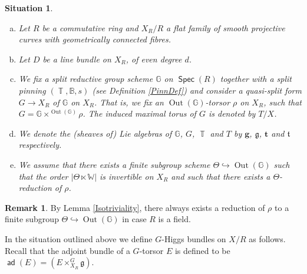 \documentclass{article}
\newcommand{\Gb}{\mathbb{G}}
\DeclareMathOperator{\Tb}{\mathbb{T}}
\DeclareMathOperator{\Spec}{\mathsf{Spec}}
\DeclareMathOperator{\ad}{\mathsf{ad}}
\DeclareMathOperator{\Out}{Out}
\let\into\hookrightarrow
\theoremstyle{definition}
\newtheorem{rmk}[definition]{Remark}
\theoremstyle{plain}
\newtheorem{situation}[definition]{Situation}
\begin{document}
\begin{situation}\label{situation:Higgs_general}
\begin{enumerate}[(a)]
\item Let $R$ be a commutative ring and $X_R/R$ a flat family of smooth projective curves with geometrically connected fibres. 
\item Let $D$ be a line bundle on $X_R$, of even degree $d$.
\item We fix a split reductive group scheme $\Gb$ on $\Spec(R)$ together with a split pinning $(\Tb,\mathbb{B},s)$ (see Definition \ref{PinnDef}) and consider a quasi-split form $G \to X_R$ of $\Gb$ on $X_R$. That is, we fix an $\Out(\Gb)$-torsor $\rho$ on $X_R$, such that $G = \Gb \times^{\Out(\Gb)} \rho$. The induced maximal torus of $G$ is denoted by $T/X$. 
\item We denote the (sheaves of) Lie algebras of $\Gb$, $G$, $\Tb$ and $T$ by $\mathbf{g}$, $\mathfrak{g}$, $\mathbf{t}$ and $\mathfrak{t}$ respectively. %
\item We assume that there exists a finite subgroup scheme $\Theta \hookrightarrow \Out(\Gb)$ such that the order $|\Theta \ltimes \mathbb{W}|$ is invertible on $X_R$ and such that there exists a $\Theta$-reduction of $\rho$.
\end{enumerate}
\end{situation}

\begin{rmk}
  By Lemma \ref{Isotriviality}, there always exists a reduction of $\rho$ to a finite subgroup $\Theta \into \Out(\Gb)$ in case $R$ is a field.
\end{rmk}
In the situation outlined above we define $G$-Higgs bundles on $X/R$ as follows. Recall that the adjoint bundle of a $G$-torsor $E$ is defined to be $\ad(E) = (E \times_{X_R}^{G} \mathfrak{g})$.
\end{document}
